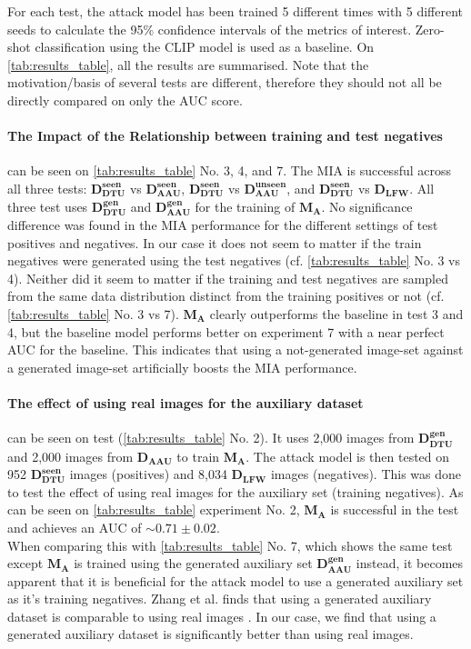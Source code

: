 For each test, the attack model has been trained 5 different times with 5 different seeds to calculate the 95\% confidence intervals of the metrics of interest. Zero-shot classification using the CLIP model \cite{radford2021learning} is used as a baseline. On \cref{tab:results_table}, all the results are summarised. Note that the motivation/basis of several tests are different, therefore they should not all be directly compared on only the AUC score. 



\paragraph{The Impact of the Relationship between training and test negatives} can be seen on \cref{tab:results_table} No. 3, 4, and 7. The MIA is successful across all three tests: $\mathbf{D_{DTU}^{seen}}$ vs $\mathbf{D_{AAU}^{seen}}$, $\mathbf{D_{DTU}^{seen}}$ vs $\mathbf{D_{AAU}^{unseen}}$, and $\mathbf{D_{DTU}^{seen}}$ vs $\mathbf{D_{LFW}}$. All three test uses $\mathbf{D_{DTU}^{gen}}$ and $\mathbf{D_{AAU}^{gen}}$ for the training of $\mathbf{M_A}$. No significance difference was found in the MIA performance for the different settings of test positives and negatives. In our case it does not seem to matter if the train negatives were generated using the test negatives (cf. \cref{tab:results_table} No. 3 vs 4). Neither did it seem to matter if the training and test negatives are sampled from the same data distribution distinct from the training positives or not (cf. \cref{tab:results_table} No. 3 vs 7). $\mathbf{M_A}$ clearly outperforms the baseline in test 3 and 4, but the baseline model performs better on experiment 7 with a near perfect AUC for the baseline. This indicates that using a not-generated image-set against a generated image-set artificially boosts the MIA performance.

\paragraph{The effect of using real images for the auxiliary dataset} can be seen on test (\cref{tab:results_table} No. 2). It uses 2,000 images from $\mathbf{D_{DTU}^{gen}}$ and 2,000 images from $\mathbf{D_{AAU}}$ to train $\mathbf{M_A}$. The attack model is then tested on 952 $\mathbf{D_{DTU}^{seen}}$ images (positives) and 8,034 $\mathbf{D_{LFW}}$ images (negatives). This was done to test the effect of using real images for the auxiliary set (training negatives). As can be seen on \cref{tab:results_table} experiment No. 2, $\mathbf{M_A}$ is successful in the test and achieves an AUC of $\sim0.71 \pm0.02$.\\
When comparing this with \cref{tab:results_table} No. 7, which shows the same test except $\mathbf{M_A}$ is trained using the generated auxiliary set $\mathbf{D_{AAU}^{gen}}$ instead, it becomes apparent that it is beneficial for the attack model to use a generated auxiliary set as it's training negatives. Zhang et al. finds that using a generated auxiliary dataset is comparable to using real images \cite{zhang2023generated}. In our case, we find that using a generated auxiliary dataset is significantly better than using real images.

